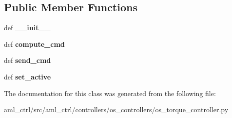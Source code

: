 \subsection*{Public Member Functions}
\begin{DoxyCompactItemize}
\item 
\hypertarget{classaml__ctrl_1_1controllers_1_1os__controllers_1_1os__torque__controller_1_1_o_s_torque_controller_ac1608a2c52270e0612e0c86bf7d1c205}{def {\bfseries \-\_\-\-\_\-init\-\_\-\-\_\-}}\label{classaml__ctrl_1_1controllers_1_1os__controllers_1_1os__torque__controller_1_1_o_s_torque_controller_ac1608a2c52270e0612e0c86bf7d1c205}

\item 
\hypertarget{classaml__ctrl_1_1controllers_1_1os__controllers_1_1os__torque__controller_1_1_o_s_torque_controller_ade8dd018b7bb2e5106b154b36948d8d1}{def {\bfseries compute\-\_\-cmd}}\label{classaml__ctrl_1_1controllers_1_1os__controllers_1_1os__torque__controller_1_1_o_s_torque_controller_ade8dd018b7bb2e5106b154b36948d8d1}

\item 
\hypertarget{classaml__ctrl_1_1controllers_1_1os__controllers_1_1os__torque__controller_1_1_o_s_torque_controller_a31d3e8ae8563a5f31b173d87eafaa996}{def {\bfseries send\-\_\-cmd}}\label{classaml__ctrl_1_1controllers_1_1os__controllers_1_1os__torque__controller_1_1_o_s_torque_controller_a31d3e8ae8563a5f31b173d87eafaa996}

\item 
\hypertarget{classaml__ctrl_1_1controllers_1_1os__controllers_1_1os__torque__controller_1_1_o_s_torque_controller_a73b83e3fd7cfaead53fa8287766f7d61}{def {\bfseries set\-\_\-active}}\label{classaml__ctrl_1_1controllers_1_1os__controllers_1_1os__torque__controller_1_1_o_s_torque_controller_a73b83e3fd7cfaead53fa8287766f7d61}

\end{DoxyCompactItemize}


The documentation for this class was generated from the following file\-:\begin{DoxyCompactItemize}
\item 
aml\-\_\-ctrl/src/aml\-\_\-ctrl/controllers/os\-\_\-controllers/os\-\_\-torque\-\_\-controller.\-py\end{DoxyCompactItemize}
